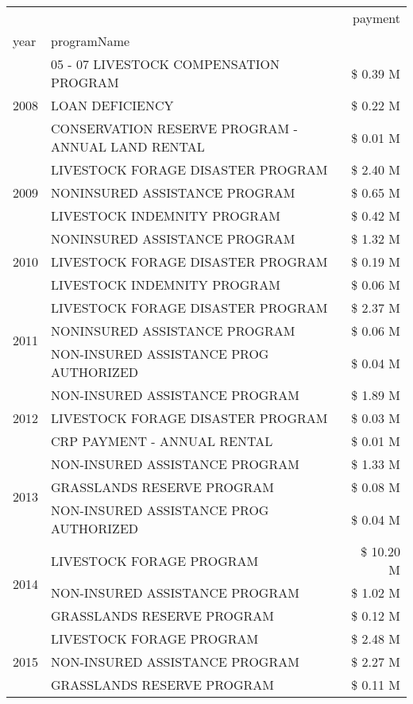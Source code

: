 \begin{tabular}{llr}
\toprule
 &  & payment \\
year & programName &  \\
\midrule
\multirow[t]{3}{*}{2008} & 05 - 07 LIVESTOCK COMPENSATION PROGRAM & \$ 0.39 M \\
 & LOAN DEFICIENCY & \$ 0.22 M \\
 & CONSERVATION RESERVE PROGRAM - ANNUAL LAND RENTAL & \$ 0.01 M \\
\cline{1-3}
\multirow[t]{3}{*}{2009} & LIVESTOCK FORAGE DISASTER  PROGRAM & \$ 2.40 M \\
 & NONINSURED ASSISTANCE PROGRAM & \$ 0.65 M \\
 & LIVESTOCK INDEMNITY PROGRAM & \$ 0.42 M \\
\cline{1-3}
\multirow[t]{3}{*}{2010} & NONINSURED ASSISTANCE PROGRAM & \$ 1.32 M \\
 & LIVESTOCK FORAGE DISASTER  PROGRAM & \$ 0.19 M \\
 & LIVESTOCK INDEMNITY PROGRAM & \$ 0.06 M \\
\cline{1-3}
\multirow[t]{3}{*}{2011} & LIVESTOCK FORAGE DISASTER PROGRAM & \$ 2.37 M \\
 & NONINSURED ASSISTANCE PROGRAM & \$ 0.06 M \\
 & NON-INSURED ASSISTANCE PROG AUTHORIZED & \$ 0.04 M \\
\cline{1-3}
\multirow[t]{3}{*}{2012} & NON-INSURED ASSISTANCE PROGRAM & \$ 1.89 M \\
 & LIVESTOCK FORAGE DISASTER PROGRAM & \$ 0.03 M \\
 & CRP PAYMENT - ANNUAL RENTAL & \$ 0.01 M \\
\cline{1-3}
\multirow[t]{3}{*}{2013} & NON-INSURED ASSISTANCE PROGRAM & \$ 1.33 M \\
 & GRASSLANDS RESERVE PROGRAM & \$ 0.08 M \\
 & NON-INSURED ASSISTANCE PROG AUTHORIZED & \$ 0.04 M \\
\cline{1-3}
\multirow[t]{3}{*}{2014} & LIVESTOCK FORAGE PROGRAM & \$ 10.20 M \\
 & NON-INSURED ASSISTANCE PROGRAM & \$ 1.02 M \\
 & GRASSLANDS RESERVE PROGRAM & \$ 0.12 M \\
\cline{1-3}
\multirow[t]{3}{*}{2015} & LIVESTOCK FORAGE PROGRAM & \$ 2.48 M \\
 & NON-INSURED ASSISTANCE PROGRAM & \$ 2.27 M \\
 & GRASSLANDS RESERVE PROGRAM & \$ 0.11 M \\

\end{tabular}
